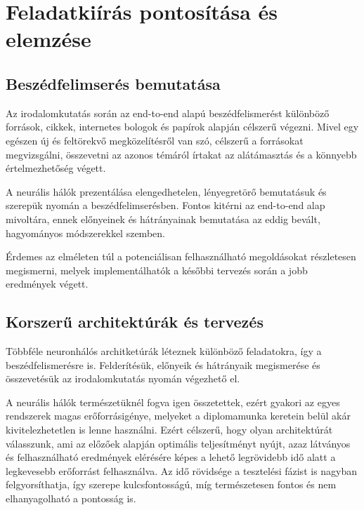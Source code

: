 \chapter{Feladatkiírás pontosítása és elemzése}

\section{Beszédfelimserés bemutatása}

Az irodalomkutatás során az end-to-end alapú beszédfelismerést különböző források, cikkek, internetes bologok és papírok alapján célszerű végezni. Mivel egy egészen új és feltörekvő megközelítésről van szó, célszerű a forrásokat megvizsgálni, összevetni az azonos témáról írtakat az alátámasztás és a könnyebb értelmezhetőség végett.

A neurális hálók prezentálása elengedhetelen, lényegretörő bemutatásuk és szerepük nyomán a beszédfelimserésben. Fontos kitérni az end-to-end alap mivoltára, ennek előnyeinek és hátrányainak bemutatása az eddig bevált, hagyományos módszerekkel szemben.

Érdemes az elméleten túl a potenciálisan felhasználható megoldásokat részletesen megismerni, melyek implementálhatók a későbbi tervezés során a jobb eredmények végett.

\section{Korszerű architektúrák és tervezés}

Többféle neuronhálós architketúrák léteznek különböző feladatokra, így a beszédfelismerésre is. Felderítésük, előnyeik és hátrányaik megismerése és összevetésük az irodalomkutatás nyomán végezhető el. 

A neurális hálók természetüknél fogva igen összetettek, ezért gyakori az egyes rendszerek magas erőforrásigénye, melyeket a diplomamunka keretein belül akár kivitelezhetetlen is lenne használni. Ezért célszerű, hogy olyan architektúrát válasszunk, ami az előzőek alapján optimális teljesítményt nyújt, azaz látványos és felhasználható eredmények elérésére képes a lehető legrövidebb idő alatt a legkevesebb erőforrást felhasználva. Az idő rövidsége a tesztelési fázist is nagyban felgyorsíthatja, így szerepe kulcsfontosságú, míg természetesen fontos és nem elhanyagolható a pontosság is.

